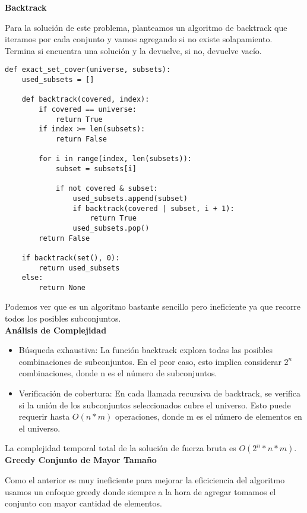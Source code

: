 \documentclass{article}
\begin{document}
\textbf{Backtrack}

Para la solución de este problema, planteamos un algoritmo de backtrack que iteramos por cada conjunto y vamos agregando si no existe solapamiento. Termina si encuentra una solución y la devuelve, si no, devuelve vacío.

\begin{lstlisting}
def exact_set_cover(universe, subsets):
    used_subsets = []

    def backtrack(covered, index):
        if covered == universe:
            return True
        if index >= len(subsets):
            return False

        for i in range(index, len(subsets)):
            subset = subsets[i]

            if not covered & subset:
                used_subsets.append(subset)
                if backtrack(covered | subset, i + 1):
                    return True
                used_subsets.pop()
        return False

    if backtrack(set(), 0):
        return used_subsets
    else:
        return None
\end{lstlisting}

Podemos ver que es un algoritmo bastante sencillo pero ineficiente ya que recorre todos los posibles subconjuntos.\\

\textbf{Análisis de Complejidad}

\begin{itemize}
    \item Búsqueda exhaustiva: La función backtrack explora todas las posibles combinaciones de subconjuntos. En el peor caso, esto implica considerar $2^n$ combinaciones, donde n es el número de subconjuntos.
    \item Verificación de cobertura: En cada llamada recursiva de backtrack, se verifica si la unión de los subconjuntos seleccionados cubre el universo. Esto puede requerir hasta $O(n * m)$ operaciones, donde m es el número de elementos en el universo.
\end{itemize}

La complejidad temporal total de la solución de fuerza bruta es $O(2^n * n * m)$.\\

\textbf{Greedy Conjunto de Mayor Tamaño}

Como el anterior es muy ineficiente para mejorar la eficiciencia del algoritmo usamos un enfoque greedy donde siempre a la hora de agregar tomamos el conjunto con mayor cantidad de elementos.\\
\end{document}
